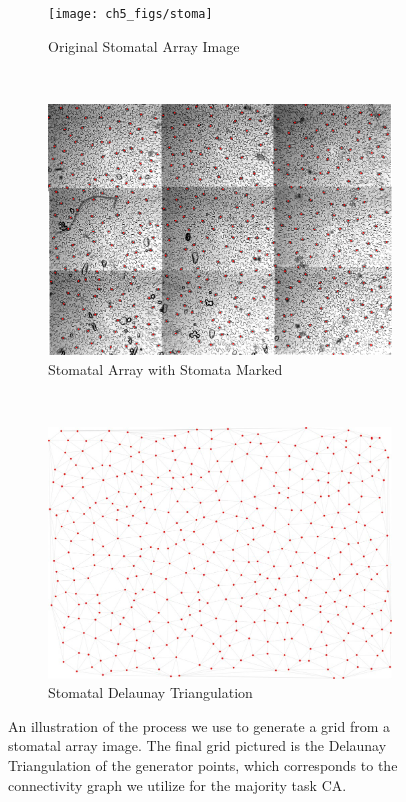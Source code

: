\documentclass[a4paper,11pt]{report}
\begin{document}
\begin{figure}[htp]
\centering
  \begin{subfigure}[t]{0.55\textwidth}
  \texttt{[image: ch5\_figs/stoma]}
  \caption{Original Stomatal Array Image}
  \end{subfigure}
  ~
  \begin{subfigure}[t]{0.55\textwidth}
  \centering
  \includegraphics[width=\textwidth]{ch5_figs/stoma-colored}
  \caption{Stomatal Array with Stomata Marked}
  \end{subfigure}
  ~
  \begin{subfigure}[t]{0.55\textwidth}
  \centering
  \includegraphics[width=\textwidth]{ch5_figs/stoma_graph}
  \caption{Stomatal Delaunay Triangulation}
  \end{subfigure}
\caption[Grid Generation from Stomatal Array]{
  An illustration of the process we use to generate a grid from a stomatal array image. The final grid pictured is the Delaunay Triangulation of the generator points, which corresponds to the connectivity graph we utilize for the majority task CA.
  }
\label{fig:stoma_graph_gen}
\end{figure}
\end{document}
